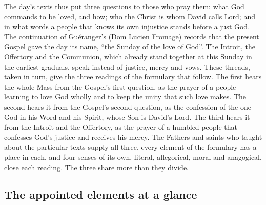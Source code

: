 The day's texts thus put three questions to those who pray them: what God
commands to be loved, and how; who the Christ is whom David calls Lord; and in
what words a people that knows its own injustice stands before a just God.
The continuation of Guéranger's  (Dom Lucien Fromage)
records that the present Gospel gave the day its name, ``the
Sunday of the love of God''. The Introit, the Offertory and the Communion,
which already stand together at this Sunday in the earliest graduals, speak
instead of justice, mercy and vows. These threads, taken in turn, give the
three readings of the formulary that follow. The first hears the whole Mass from the
Gospel's first question, as the prayer of a people learning to love God
wholly and to keep the unity that such love makes. The second hears it from
the Gospel's second question, as the confession of the one God in his Word and
his Spirit, whose Son is David's Lord. The third hears it from the Introit and
the Offertory, as the prayer of a humbled people that confesses God's justice
and receives his mercy. The Fathers and saints who taught about the
particular texts supply all three, every element of the formulary has a place
in each, and four senses of its own, literal, allegorical, moral and
anagogical, close each reading. The three share more than they divide.

\subsection{The appointed elements at a glance}

